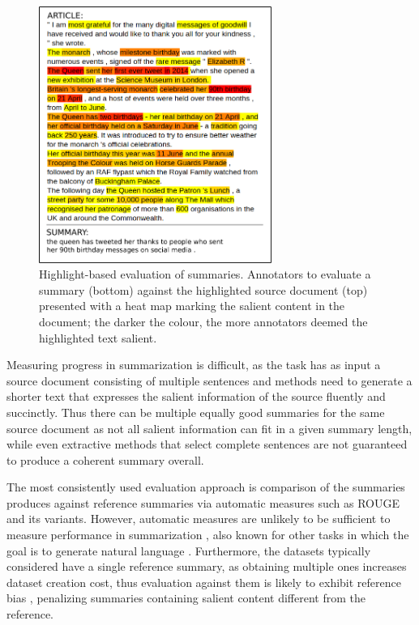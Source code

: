 \documentclass[11pt,a4paper]{article}
\begin{document}
\begin{figure}[t!]
    \centering
    \includegraphics[width=7.6cm]{heatmap_summ}
    \caption{Highlight-based evaluation of summaries. Annotators to evaluate a summary (bottom) against the highlighted source document (top) presented with a heat map marking the salient content in the document; the darker the colour, the more annotators deemed the highlighted text salient.
    }
  \label{image:heatmap}
\end{figure}

Measuring progress in summarization is difficult, as the task has as input a source document consisting of multiple sentences and methods need to generate a shorter text that expresses the salient information of the source fluently and succinctly. Thus there can be multiple equally good summaries for the same source document as not all salient information can fit in a given summary length, while even extractive methods that select complete sentences are not guaranteed to produce a coherent summary overall.

The most consistently used evaluation approach is comparison of the summaries produces against reference summaries via 
automatic measures such as ROUGE \citep{Lin2004} and its variants. However, automatic measures are unlikely to be sufficient to measure performance in summarization \citep{schluter:2017:EACLshort}, also known for other tasks in which the goal is to generate natural language \citep{novikova2017we}. Furthermore, the datasets typically considered have a single reference summary, as obtaining multiple ones increases dataset creation cost, thus evaluation against them is likely to exhibit reference bias \citep{Louis2013,fomicheva2016reference}, penalizing summaries containing salient content different from the reference. 
\end{document}
